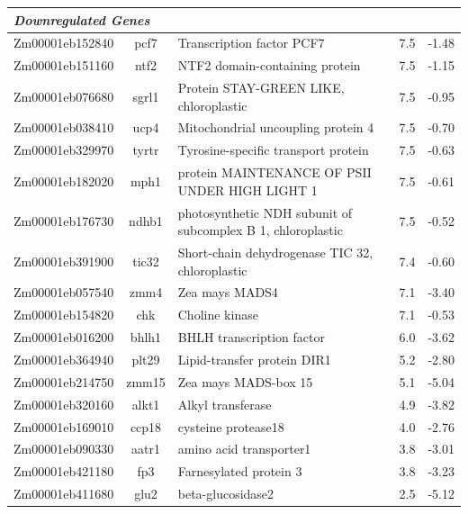 \documentclass[9pt,twocolumn,twoside]{rilabRxiv}
\begin{document}
\begin{table}[h!]
\begin{tabular}{ccp{7.5cm}cc}
\multicolumn{5}{l}{\textit{\textbf{Downregulated Genes}}} \\
\hline
Zm00001eb152840 & pcf7 & Transcription factor PCF7 & 7.5 & -1.48\\
Zm00001eb151160 & ntf2 & NTF2 domain-containing protein & 7.5 & -1.15\\
Zm00001eb076680 & sgrl1 & Protein STAY-GREEN LIKE, chloroplastic & 7.5 & -0.95\\
Zm00001eb038410 & ucp4 & Mitochondrial uncoupling protein 4 & 7.5 & -0.70\\
Zm00001eb329970 & tyrtr & Tyrosine-specific transport protein & 7.5 & -0.63\\
Zm00001eb182020 & mph1 & protein MAINTENANCE OF PSII UNDER HIGH LIGHT 1 & 7.5 & -0.61\\
Zm00001eb176730 & ndhb1 & photosynthetic NDH subunit of subcomplex B 1, chloroplastic & 7.5 & -0.52\\
Zm00001eb391900 & tic32 & Short-chain dehydrogenase TIC 32, chloroplastic & 7.4 & -0.60\\
Zm00001eb057540 & zmm4 & Zea mays MADS4 & 7.1 & -3.40\\
Zm00001eb154820 & chk & Choline kinase & 7.1 & -0.53\\
Zm00001eb016200 & bhlh1 & BHLH transcription factor & 6.0 & -3.62\\
Zm00001eb364940 & plt29 & Lipid-transfer protein DIR1 & 5.2 & -2.80\\
Zm00001eb214750 & zmm15 & Zea mays MADS-box 15 & 5.1 & -5.04\\
Zm00001eb320160 & alkt1 & Alkyl transferase & 4.9 & -3.82\\
Zm00001eb169010 & ccp18 & cysteine protease18 & 4.0 & -2.76\\
Zm00001eb090330 & aatr1 & amino acid transporter1 & 3.8 & -3.01\\
Zm00001eb421180 & fp3 & Farnesylated protein 3 & 3.8 & -3.23\\
Zm00001eb411680 & glu2 & beta-glucosidase2 & 2.5 & -5.12\\
\hline
\end{tabular}
\end{table}
\end{document}
